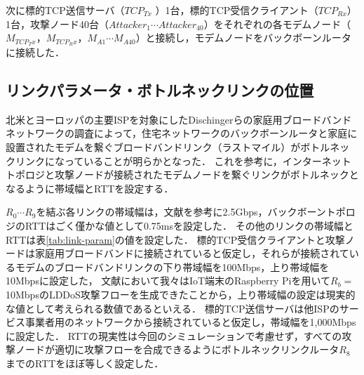 \documentclass[Japanese]{dicomopapers}
\begin{document}
次に標的TCP送信サーバ（$TCP_{Tx}$ ）1台，標的TCP受信クライアント（$TCP_{Rx}$）1台，攻撃ノード40台（$Attacker_{1} \cdots Attacker_{40}$）をそれぞれの各モデムノード（$M_{TCP_Tx}$，$M_{TCP_Rx}$，$M_{A1} \cdots M_{A40}$）と接続し，モデムノードをバックボーンルータに接続した．

\subsection{リンクパラメータ・ボトルネックリンクの位置}
北米とヨーロッパの主要ISPを対象にしたDischingerらの家庭用ブロードバンドネットワークの調査によって，住宅ネットワークのバックボーンルータと家庭に設置されたモデムを繋ぐブロードバンドリンク（ラストマイル）がボトルネックリンクになっていることが明らかとなった\cite{broadband-characterizing}．
これを参考に，インターネットトポロジと攻撃ノードが接続されたモデムノードを繋ぐリンクがボトルネックとなるように帯域幅とRTTを設定する．

$R_{0} \cdots R_{9}$を結ぶ各リンクの帯域幅は，文献\cite{internet-backbone}を参考に2.5Gbps，バックボーントポロジのRTTはごく僅かな値として0.75msを設定した．
その他のリンクの帯域幅とRTTは表\ref{tab:link-param}の値を設定した．
標的TCP受信クライアントと攻撃ノードは家庭用ブロードバンドに接続されていると仮定し，それらが接続されているモデムのブロードバンドリンクの下り帯域幅を100Mbps，上り帯域幅を10Mbpsに設定した，
文献\cite{mine-wip-paper}において我々はIoT端末のRaspberry Piを用いて$R_{b}=$10MbpsのLDDoS攻撃フローを生成できたことから，上り帯域幅の設定は現実的な値として考えられる数値であるといえる．
標的TCP送信サーバは他ISPのサービス事業者用のネットワークから接続されていると仮定し，帯域幅を1,000Mbpsに設定した．
RTTの現実性は今回のシミュレーションで考慮せず，すべての攻撃ノードが適切に攻撃フローを合成できるようにボトルネックリンクルータ$R_{8}$までのRTTをほぼ等しく設定した．
\end{document}
